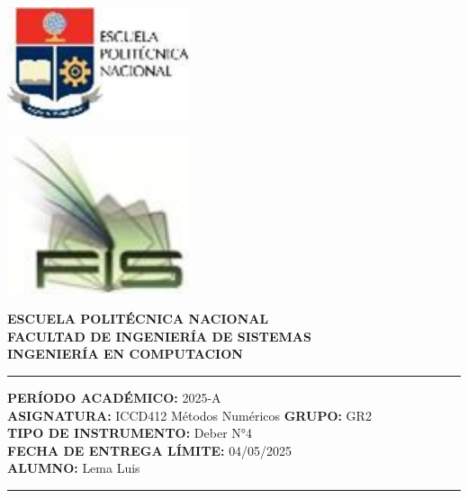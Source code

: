 \documentclass[12pt]{article}
\begin{document}
\begin{minipage}{0.45\textwidth}
    \includegraphics[width=0.4\textwidth]{inFiles/Figures/epnLogo.jpg}
\end{minipage}
\hfill
\begin{minipage}{0.45\textwidth}
    \raggedleft
    \includegraphics[width=0.4\textwidth]{inFiles/Figures/FIS_logo.jpg}
\end{minipage}

\vspace{0.5cm}

\begin{center}
    \textbf{ESCUELA POLITÉCNICA NACIONAL}\\[0.2cm]
    \textbf{FACULTAD DE INGENIERÍA DE SISTEMAS}\\[0.2cm]
    \textbf{INGENIERÍA {\textbf{EN COMPUTACION}}}
\end{center}

\vspace{0.5cm}
\hrule
\vspace{0.5cm}

\noindent\textbf{PERÍODO ACADÉMICO:} 2025-A\\[0.2cm]
\noindent\textbf{ASIGNATURA:} ICCD412 Métodos Numéricos \hfill \textbf{GRUPO:} GR2\\[0.2cm]
\noindent\textbf{TIPO DE INSTRUMENTO:} {Deber N°4}\\[0.2cm]
\noindent\textbf{FECHA DE ENTREGA LÍMITE:} {04/05/2025}\\[0.2cm]
\noindent\textbf{ALUMNO:} {Lema Luis}

\vspace{0.5cm}
\hrule
\vspace{1cm}
\end{document}
